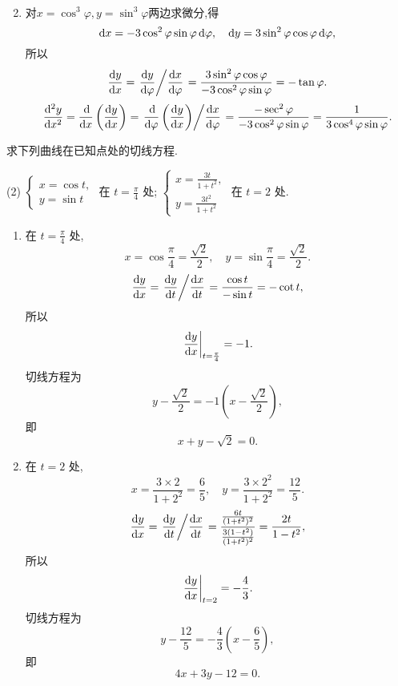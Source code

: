 \begin{solution}
\begin{enumerate}
\begin{align*}
              \end{align*}
        \item 对$x = \cos^3\varphi,y = \sin^3\varphi$两边求微分,得
        $$\operatorname{d\!} x = -3 \cos^2 \varphi \sin \varphi \operatorname{d\!} \varphi, \quad \operatorname{d\!} y = 3 \sin^2 \varphi \cos \varphi \operatorname{d\!} \varphi,$$所以
          $$
              \frac{\operatorname{d\!} y}{\operatorname{d\!} x} = \left.\dfrac{\operatorname{d\!} y}{\operatorname{d\!} \varphi}\middle\slash\dfrac{\operatorname{d\!} x}{\operatorname{d\!} \varphi}\right. = \frac{3 \sin^2 \varphi \cos \varphi}{-3 \cos^2 \varphi \sin \varphi} = -\tan\varphi.
          $$
          $$\frac{\dif\,\!^2 y}{\dif x^2} = \frac{\dif}{\dif x} \left( \frac{\dif y}{\dif x} \right) =
              \flatfrac{\frac{\dif}{\dif \varphi} \left( \frac{\dif y}{\dif x} \right)}{\frac{\dif x}{\dif \varphi} }= \frac{-\sec^2 \varphi}{-3 \cos^2 \varphi \sin \varphi} = \frac{1}{3 \cos^4 \varphi \sin \varphi}.$$
    \end{enumerate}
\end{solution}


\begin{exercise}[3.2.4]
    求下列曲线在已知点处的切线方程.
    \begin{tasks}[label=(\arabic*)](2)
        \task $\begin{cases} x=\cos t, \\ y=\sin t \end{cases}$ 在 $t=\frac{\pi}{4}$ 处;
        \task $\begin{cases} x=\frac{3t}{1+t^2}, \\ y=\frac{3t^2}{1+t^2} \end{cases}$ 在 $t=2$ 处.
    \end{tasks}
\end{exercise}

\begin{solution}
    \begin{enumerate}
        \item 在 $t=\frac{\pi}{4}$ 处, $$x=\cos\frac{\pi}{4}=\frac{\sqrt{2}}{2}, \quad y=\sin\frac{\pi}{4}=\frac{\sqrt{2}}{2}.$$
          $$\frac{\operatorname{d\!} y}{\operatorname{d\!} x} = \left.\dfrac{\operatorname{d\!} y}{\operatorname{d\!} t}\middle\slash\dfrac{\operatorname{d\!} x}{\operatorname{d\!} t}\right. = \frac{\cos t}{-\sin t} = -\cot t,$$所以
          $$\left. \frac{\operatorname{d\!} y}{\operatorname{d\!} x} \right|_{t=\frac{\pi}{4}} = -1.$$
          切线方程为 $$y - \frac{\sqrt{2}}{2} = -1 \left( x - \frac{\sqrt{2}}{2} \right),$$即$$x + y - \sqrt{2} = 0.$$
        \item 在 $t=2$ 处, $$x=\frac{3 \times 2}{1+2^2} = \frac{6}{5}, \quad y=\frac{3 \times 2^2}{1+2^2} = \frac{12}{5}.$$
          $$\frac{\operatorname{d\!} y}{\operatorname{d\!} x} = \left.\dfrac{\operatorname{d\!} y}{\operatorname{d\!} t}\middle\slash\dfrac{\operatorname{d\!} x}{\operatorname{d\!} t}\right. = \frac{\frac{6t}{(1+t^2)^2}}{\frac{3(1-t^2)}{(1+t^2)^2}} = \frac{2t}{1-t^2},$$所以
          $$\left. \frac{\operatorname{d\!} y}{\operatorname{d\!} x} \right|_{t=2} = -\frac{4}{3}.$$
          切线方程为 $$y - \frac{12}{5} = -\frac{4}{3} \left( x - \frac{6}{5} \right),$$即$$4x + 3y - 12 = 0.$$
    \end{enumerate}
\end{solution}

\newpage
